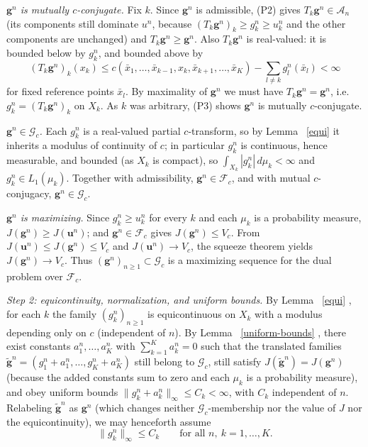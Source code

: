 \documentclass[twoside,11pt,a4paper]{article}
\newcommand*{\SavedRef}{}
\let\SavedRef\ref
\renewcommand*{\ref}[1]{  \begingroup
    \hypersetup{
      linkcolor=linkequation,
      linkbordercolor=linkequation,
    }    \SavedRef{#1}  \endgroup
}
\begin{document}
\emph{$\boldsymbol g^n$ is mutually $c$-conjugate.} Fix $k$. Since
$\boldsymbol g^n$ is admissible, (P2) gives $T_k\boldsymbol g^n\in\mathcal A_n$
(its components still dominate $u^n$, because $(T_k\boldsymbol g^n)_k\ge g_k^n\ge u_k^n$
and the other components are unchanged) and $T_k\boldsymbol g^n\ge\boldsymbol g^n$.
Also $T_k\boldsymbol g^n$ is real-valued: it is bounded below by $g_k^n$, and
bounded above by
\[
(T_k\boldsymbol g^n)_k(x_k)\le c(\bar x_1,\dots,\bar x_{k-1},x_k,\bar x_{k+1},\dots,\bar x_K)
-\sum_{l\ne k}g_l^n(\bar x_l)<\infty
\]
for fixed reference points $\bar x_l$. By maximality of $\boldsymbol g^n$ we must
have $T_k\boldsymbol g^n=\boldsymbol g^n$, i.e.\ $g_k^n=(T_k\boldsymbol g^n)_k$ on
$X_k$. As $k$ was arbitrary, (P3) shows $\boldsymbol g^n$ is mutually
$c$-conjugate.

\emph{$\boldsymbol g^n\in\mathcal G_c$.} Each $g_k^n$ is a real-valued partial
$c$-transform, so by Lemma~\ref{equi} it inherits a modulus of continuity of $c$;
in particular $g_k^n$ is continuous, hence measurable, and bounded (as $X_k$ is
compact), so $\int_{X_k}|g_k^n|\,d\mu_k<\infty$ and $g_k^n\in L_1(\mu_k)$.
Together with admissibility, $\boldsymbol g^n\in\mathcal F_c$, and with mutual
$c$-conjugacy, $\boldsymbol g^n\in\mathcal G_c$.

\emph{$\boldsymbol g^n$ is maximizing.} Since $g_k^n\ge u_k^n$ for every $k$ and
each $\mu_k$ is a probability measure,
$J(\boldsymbol g^n)\ge J(\boldsymbol u^n)$; and $\boldsymbol g^n\in\mathcal F_c$
gives $J(\boldsymbol g^n)\le V_c$. From
$J(\boldsymbol u^n)\le J(\boldsymbol g^n)\le V_c$ and
$J(\boldsymbol u^n)\to V_c$, the squeeze theorem yields
$J(\boldsymbol g^n)\to V_c$. Thus
$(\boldsymbol g^n)_{n\ge1}\subset\mathcal G_c$ is a maximizing sequence for the
dual problem over $\mathcal F_c$.

\medskip
\noindent\emph{Step 2: equicontinuity, normalization, and uniform bounds.}
By Lemma~\ref{equi}, for each $k$ the family $(g_k^n)_{n\ge1}$ is equicontinuous
on $X_k$ with a modulus depending only on $c$ (independent of $n$). By
Lemma~\ref{uniform-bounds}, there exist constants $a_1^n,\dots,a_K^n$ with
$\sum_{k=1}^K a_k^n=0$ such that the translated families
$\widetilde{\boldsymbol g}^n=(g_1^n+a_1^n,\dots,g_K^n+a_K^n)$ still belong to
$\mathcal G_c$, still satisfy $J(\widetilde{\boldsymbol g}^n)=J(\boldsymbol g^n)$
(because the added constants sum to zero and each $\mu_k$ is a probability
measure), and obey uniform bounds $\|g_k^n+a_k^n\|_\infty\le C_k<\infty$, with
$C_k$ independent of $n$. Relabeling $\widetilde{\boldsymbol g}^n$ as
$\boldsymbol g^n$ (which changes neither $\mathcal G_c$-membership nor the value of
$J$ nor the equicontinuity), we may henceforth assume
\[
\|g_k^n\|_\infty\le C_k\qquad\text{for all }n,\ k=1,\dots,K.
\]
\end{document}
